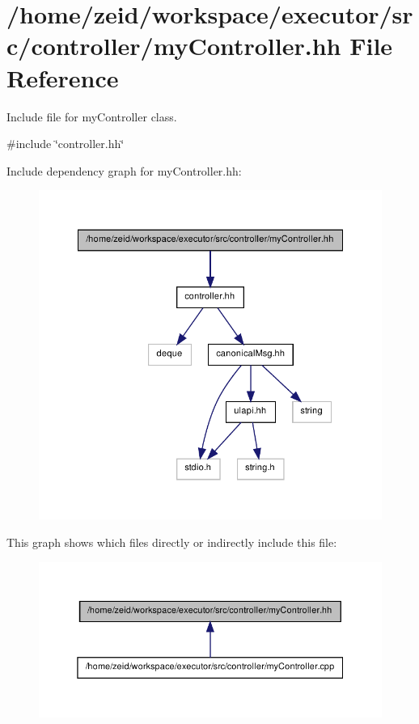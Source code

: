 \hypertarget{my_controller_8hh}{
\section{/home/zeid/workspace/executor/src/controller/myController.hh File Reference}
\label{my_controller_8hh}
}


Include file for myController class.  


{\ttfamily \#include \char`\"{}controller.hh\char`\"{}}\par
Include dependency graph for myController.hh:\nopagebreak
\begin{figure}[H]
\begin{center}
\leavevmode
\includegraphics[width=348pt]{my_controller_8hh__incl}
\end{center}
\end{figure}
This graph shows which files directly or indirectly include this file:\nopagebreak
\begin{figure}[H]
\begin{center}
\leavevmode
\includegraphics[width=352pt]{my_controller_8hh__dep__incl}
\end{center}
\end{figure}
